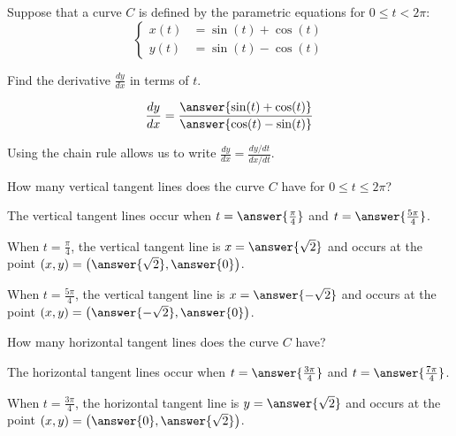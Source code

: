 \documentclass{ximera}
\author{Jim Talamo and Alex Beckwith}
\begin{document}
\begin{exercise}

Suppose that a curve $C$ is defined by the parametric equations for $0 \leq t < 2\pi$:
\[
\begin{cases}
x(t) &= \sin(t)+\cos(t) \\
y(t) &= \sin(t)-\cos(t)
\end{cases}
\]

Find the derivative $\frac{dy}{dx}$ in terms of $t$.

\[
\frac{dy}{dx} = \frac{\answer{\sin(t)+\cos(t)}}{\answer{\cos(t)-\sin(t)}}
\]

\begin{hint}
Using the chain rule allows us to write $\frac{dy}{dx} = \frac{dy/dt}{dx/dt}$.
\end{hint}

\begin{exercise}
How many vertical tangent lines does the curve $C$ have for $0 \leq t \leq 2\pi$?
\begin{multipleChoice}
\end{multipleChoice}

The vertical tangent lines occur when $t=\answer{\frac{\pi}{4}}$ and $t=\answer{\frac{5\pi}{4}}$.

\begin{exercise}
When $t=\frac{\pi}{4}$, the vertical tangent line is $x=\answer{\sqrt{2}}$ and occurs at the point $(x,y) = \left(\answer{\sqrt{2}},\answer{0}\right)$.

When $t=\frac{5\pi}{4}$, the vertical tangent line is $x=\answer{-\sqrt{2}}$ and occurs at the point $(x,y) = \left(\answer{-\sqrt{2}},\answer{0}\right)$.
\end{exercise}
\end{exercise}

\begin{exercise}
How many horizontal tangent lines does the curve $C$ have?
\begin{multipleChoice}
\end{multipleChoice}

The horizontal tangent lines occur when $t=\answer{\frac{3\pi}{4}}$ and $t= \answer{\frac{7\pi}{4}}$.

\begin{exercise}
When $t=\frac{3\pi}{4}$, the horizontal tangent line is $y=\answer{\sqrt{2}}$ and occurs at the point $(x,y) = \left(\answer{0},\answer{\sqrt{2}}\right)$.


\end{exercise}
\end{exercise}
\end{exercise}
\end{document}
